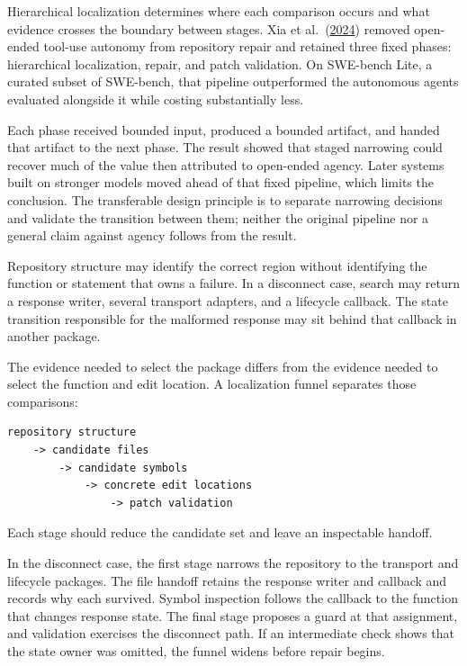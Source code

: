 Hierarchical localization determines where each comparison occurs and what evidence crosses the boundary between stages. Xia et al.~(\href{https://arxiv.org/abs/2407.01489}{2024}) removed open-ended tool-use autonomy from repository repair and retained three fixed phases: hierarchical localization, repair, and patch validation. On SWE-bench Lite, a curated subset of SWE-bench, that pipeline outperformed the autonomous agents evaluated alongside it while costing substantially less.

Each phase received bounded input, produced a bounded artifact, and handed that artifact to the next phase. The result showed that staged narrowing could recover much of the value then attributed to open-ended agency. Later systems built on stronger models moved ahead of that fixed pipeline, which limits the conclusion. The transferable design principle is to separate narrowing decisions and validate the transition between them; neither the original pipeline nor a general claim against agency follows from the result.

Repository structure may identify the correct region without identifying the function or statement that owns a failure. In a disconnect case, search may return a response writer, several transport adapters, and a lifecycle callback. The state transition responsible for the malformed response may sit behind that callback in another package.

The evidence needed to select the package differs from the evidence needed to select the function and edit location. A localization funnel separates those comparisons:

\begin{verbatim}
repository structure
    -> candidate files
        -> candidate symbols
            -> concrete edit locations
                -> patch validation
\end{verbatim}

Each stage should reduce the candidate set and leave an inspectable handoff.

In the disconnect case, the first stage narrows the repository to the transport and lifecycle packages. The file handoff retains the response writer and callback and records why each survived. Symbol inspection follows the callback to the function that changes response state. The final stage proposes a guard at that assignment, and validation exercises the disconnect path. If an intermediate check shows that the state owner was omitted, the funnel widens before repair begins.

